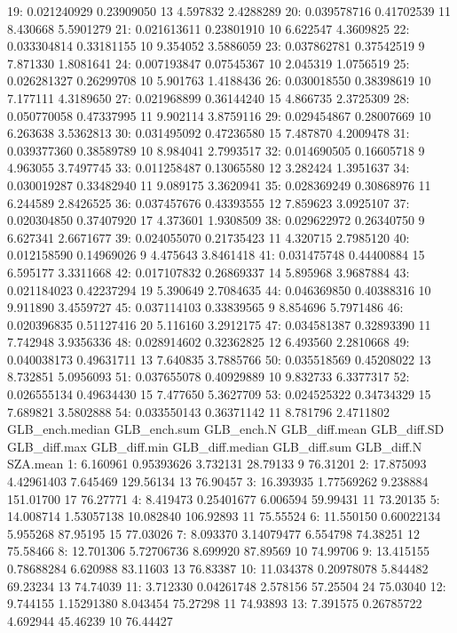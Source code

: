 \documentclass[
  10pt,
  a4paper,oneside]{article}
\begin{document}
19: 0.021240929 0.23909050 13 4.597832 2.4288289
20: 0.039578716 0.41702539 11 8.430668 5.5901279
21: 0.021613611 0.23801910 10 6.622547 4.3609825
22: 0.033304814 0.33181155 10 9.354052 3.5886059
23: 0.037862781 0.37542519 9 7.871330 1.8081641
24: 0.007193847 0.07545367 10 2.045319 1.0756519
25: 0.026281327 0.26299708 10 5.901763 1.4188436
26: 0.030018550 0.38398619 10 7.177111 4.3189650
27: 0.021968899 0.36144240 15 4.866735 2.3725309
28: 0.050770058 0.47337995 11 9.902114 3.8759116
29: 0.029454867 0.28007669 10 6.263638 3.5362813
30: 0.031495092 0.47236580 15 7.487870 4.2009478
31: 0.039377360 0.38589789 10 8.984041 2.7993517
32: 0.014690505 0.16605718 9 4.963055 3.7497745
33: 0.011258487 0.13065580 12 3.282424 1.3951637
34: 0.030019287 0.33482940 11 9.089175 3.3620941
35: 0.028369249 0.30868976 11 6.244589 2.8426525
36: 0.037457676 0.43393555 12 7.859623 3.0925107
37: 0.020304850 0.37407920 17 4.373601 1.9308509
38: 0.029622972 0.26340750 9 6.627341 2.6671677
39: 0.024055070 0.21735423 11 4.320715 2.7985120
40: 0.012158590 0.14969026 9 4.475643 3.8461418
41: 0.031475748 0.44400884 15 6.595177 3.3311668
42: 0.017107832 0.26869337 14 5.895968 3.9687884
43: 0.021184023 0.42237294 19 5.390649 2.7084635
44: 0.046369850 0.40388316 10 9.911890 3.4559727
45: 0.037114103 0.33839565 9 8.854696 5.7971486
46: 0.020396835 0.51127416 20 5.116160 3.2912175
47: 0.034581387 0.32893390 11 7.742948 3.9356336
48: 0.028914602 0.32362825 12 6.493560 2.2810668
49: 0.040038173 0.49631711 13 7.640835 3.7885766
50: 0.035518569 0.45208022 13 8.732851 5.0956093
51: 0.037655078 0.40929889 10 9.832733 6.3377317
52: 0.026555134 0.49634430 15 7.477650 5.3627709
53: 0.024525322 0.34734329 15 7.689821 3.5802888
54: 0.033550143 0.36371142 11 8.781796 2.4711802
GLB\_ench.median GLB\_ench.sum GLB\_ench.N GLB\_diff.mean GLB\_diff.SD
GLB\_diff.max GLB\_diff.min GLB\_diff.median GLB\_diff.sum GLB\_diff.N SZA.mean
1: 6.160961 0.95393626 3.732131 28.79133 9 76.31201
2: 17.875093 4.42961403 7.645469 129.56134 13 76.90457
3: 16.393935 1.77569262 9.238884 151.01700 17 76.27771
4: 8.419473 0.25401677 6.006594 59.99431 11 73.20135
5: 14.008714 1.53057138 10.082840 106.92893 11 75.55524
6: 11.550150 0.60022134 5.955268 87.95195 15 77.03026
7: 8.093370 3.14079477 6.554798 74.38251 12 75.58466
8: 12.701306 5.72706736 8.699920 87.89569 10 74.99706
9: 13.415155 0.78688284 6.620988 83.11603 13 76.83387
10: 11.034378 0.20978078 5.844482 69.23234 13 74.74039
11: 3.712330 0.04261748 2.578156 57.25504 24 75.03040
12: 9.744155 1.15291380 8.043454 75.27298 11 74.93893
13: 7.391575 0.26785722 4.692944 45.46239 10 76.44427
\end{document}
